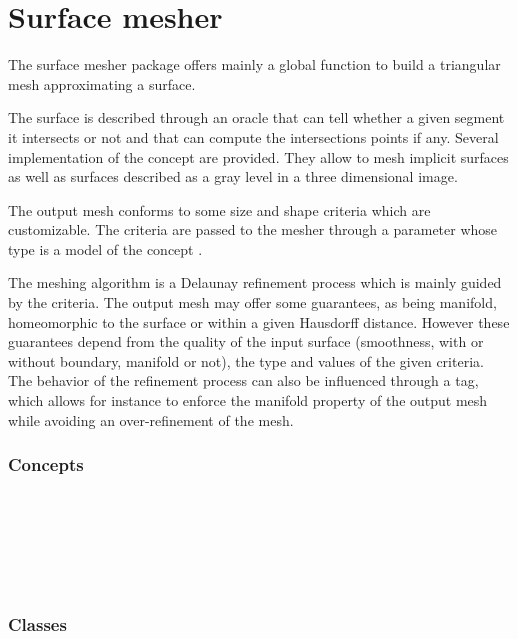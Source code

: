 \chapter{Surface mesher}


The surface mesher package offers mainly a global function
to build a triangular mesh approximating a surface.

The surface is described through an oracle that can tell whether a
given segment it intersects or not and that can compute the
intersections points if any. Several implementation of
the  concept are provided. They allow to mesh
implicit surfaces as well as  surfaces described as a gray level in a three
dimensional image.

The output mesh conforms to some size and shape criteria 
which are customizable. The criteria are passed to the mesher
through a parameter 
whose type is a model of the
concept .

The meshing algorithm is a Delaunay refinement process
which is mainly guided by the criteria. 
The output mesh may offer some guarantees, as being manifold,
homeomorphic to the surface or within a given
Hausdorff distance.  However these guarantees depend 
from the quality of the input surface (smoothness, with or without
boundary, manifold or  not),
the type and values of the given criteria. 
The behavior of the refinement process can also be influenced through
a tag, which allows for instance to enforce the manifold property
of  the output mesh  while avoiding an over-refinement of the mesh.


\subsection*{Concepts}

\\
 \\
 \\
 \\
 \\


\subsection*{Classes}
 \\
 \\
 \\
 \\

